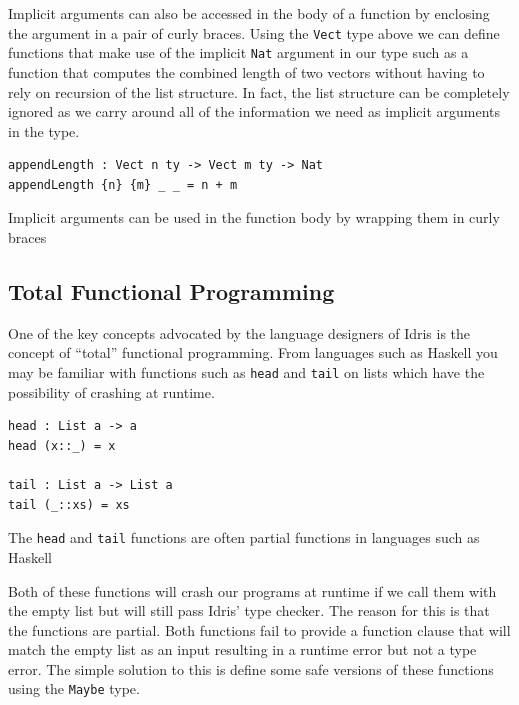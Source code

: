 \documentclass[a4paper, notitlepage]{report}
\begin{document}
Implicit arguments can also be accessed in the body of a function by enclosing
the argument in a pair of curly braces. Using the \texttt{Vect} type above we can define
functions that make use of the implicit \texttt{Nat} argument in our type such as a
function that computes the combined length of two vectors without having to rely
on recursion of the list structure. In fact, the list structure can be
completely ignored as we carry around all of the information we need as implicit
arguments in the type.

\begin{listing}[H]
\begin{verbatim}
appendLength : Vect n ty -> Vect m ty -> Nat
appendLength {n} {m} _ _ = n + m
\end{verbatim}
\caption{Implicit arguments can be used in the function body by wrapping them in curly braces}
\end{listing}

\subsection{Total Functional Programming}
\label{sec:org49f3705}
One of the key concepts advocated by the language designers of Idris is the
concept of ``total'' functional programming. From languages such as Haskell you
may be familiar with functions such as \texttt{head} and \texttt{tail} on lists which have the
possibility of crashing at runtime.

\begin{listing}[H]
\begin{verbatim}
head : List a -> a
head (x::_) = x

tail : List a -> List a
tail (_::xs) = xs
\end{verbatim}
\caption{The \texttt{head} and \texttt{tail} functions are often partial functions in languages such as Haskell}
\end{listing}

Both of these functions will crash our programs at runtime if we call them with
the empty list but will still pass Idris' type checker. The reason for this is
that the functions are partial. Both functions fail to provide a function clause
that will match the empty list as an input resulting in a runtime error but not
a type error. The simple solution to this is define some safe versions of these
functions using the \texttt{Maybe} type.
\end{document}
